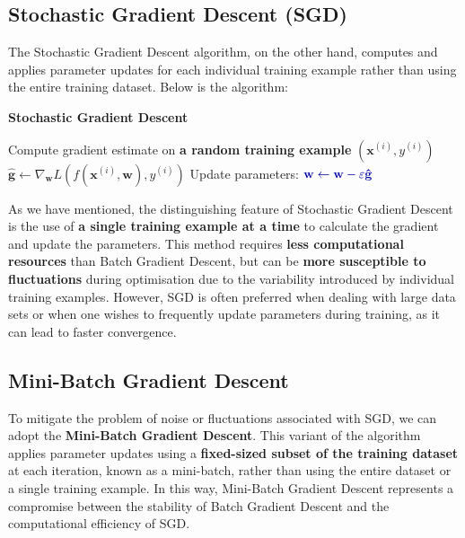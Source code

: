 \subsection{Stochastic Gradient Descent (SGD)}

The Stochastic Gradient Descent algorithm, on the other hand, computes and applies parameter updates for each individual training example rather than using the entire training dataset. Below is the algorithm:

\begin{algorithm}
\renewcommand\thealgorithm{}
\caption{\textbf{\textcolor{mygreen}{Stochastic Gradient Descent}}}
\begin{algorithmic}[1]
    \STATE Compute gradient estimate on \textbf{\textcolor{myred}{a random training example}} $(\mathbf{x}^{(i)}, y^{(i)})$
    \STATE 
    $
    \mathbf{\hat{g}} \leftarrow\nabla_{\mathbf{w}} L(f(\mathbf{x}^{(i)},\mathbf{w}), y^{(i)})
    $
    \STATE Update parameters:
    $
    \textcolor{mybluee}{\mathbf{w} \leftarrow \mathbf{w} - \varepsilon \mathbf{\hat{g}}}
    $
\ENDWHILE
\end{algorithmic}
\end{algorithm}

As we have mentioned, the distinguishing feature of Stochastic Gradient Descent is the use of \textbf{\textcolor{myred}{a single training example at a time}} to calculate the gradient and update the parameters. This method requires \textbf{less computational resources} than Batch Gradient Descent, but can be \textbf{more susceptible to fluctuations} during optimisation due to the variability introduced by individual training examples. However, SGD is often preferred when dealing with large data sets or when one wishes to frequently update parameters during training, as it can lead to faster convergence. 

\subsection{Mini-Batch Gradient Descent}
To mitigate the problem of noise or fluctuations associated with SGD, we can adopt the \textbf{\textcolor{mygreen}{Mini-Batch Gradient Descent}}. This variant of the algorithm applies parameter updates using a \textbf{\textcolor{myred}{fixed-sized subset of the training dataset}} at each iteration, known as a mini-batch, rather than using the entire dataset or a single training example. In this way, Mini-Batch Gradient Descent represents a compromise between the stability of Batch Gradient Descent and the computational efficiency of SGD.

